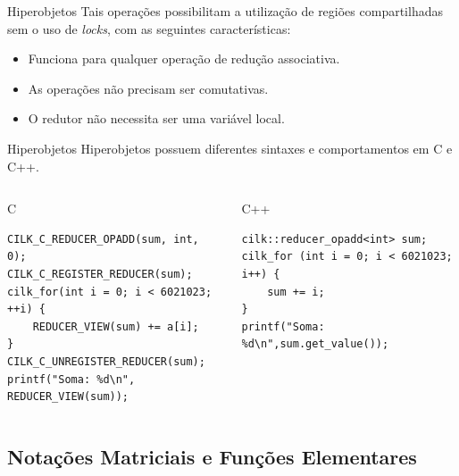 \documentclass{beamer}
\begin{document}
\begin{frame}[fragile]{Hiperobjetos}
    Tais operações possibilitam a utilização de regiões compartilhadas sem o uso de \textit{locks}, com as seguintes características:
\begin{itemize}
	\item Funciona para qualquer operação de redução associativa.
    \item As operações não precisam ser comutativas.
    \item O redutor não necessita ser uma variável local.
\end{itemize}
\end{frame}

\begin{frame}[fragile]{Hiperobjetos}
    Hiperobjetos possuem diferentes sintaxes e comportamentos em C e C++.
\begin{columns}[T]
\begin{column}{0.4\textwidth}
\begin{tiny}
\begin{block}{C}
\begin{lstlisting}
CILK_C_REDUCER_OPADD(sum, int, 0);
CILK_C_REGISTER_REDUCER(sum);
cilk_for(int i = 0; i < 6021023; ++i) {
    REDUCER_VIEW(sum) += a[i];
}
CILK_C_UNREGISTER_REDUCER(sum);
printf("Soma: %d\n", REDUCER_VIEW(sum));
\end{lstlisting}
\end{block}
\end{tiny}
\end{column}

\begin{column}{0.4\textwidth}

\begin{tiny}
\begin{block}{C++}
\begin{lstlisting}
cilk::reducer_opadd<int> sum;
cilk_for (int i = 0; i < 6021023; i++) {
    sum += i;
}
printf("Soma: %d\n",sum.get_value());
\end{lstlisting}
\end{block}
\end{tiny}

\end{column}
\end{columns}
\end{frame}

\subsection{Notações Matriciais e Funções Elementares}
\end{document}
